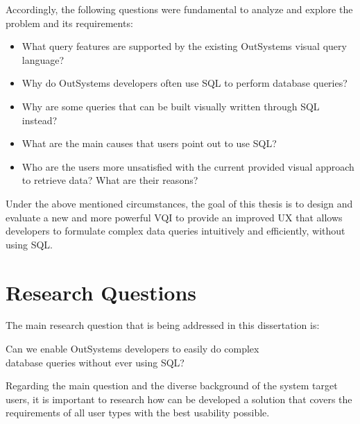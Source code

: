 Accordingly, the following questions were fundamental to analyze and explore the problem and its requirements: 

\begin{itemize}
  \item What query features are supported by the existing OutSystems visual query language?
  \item Why do OutSystems developers often use \gls{SQL} to perform database queries?
  \item Why are some queries that can be built visually written through \gls{SQL} instead?
  \item What are the main causes that users point out to use \gls{SQL}?
  \item Who are the users more unsatisfied with the current provided visual approach to retrieve data? What are their reasons?
\end{itemize}



Under the above mentioned circumstances, the goal of this thesis is to design and evaluate a new and more powerful \gls{VQI} to provide an improved \gls{UX} that allows developers to formulate complex data queries intuitively and efficiently, without using \gls{SQL}.

\section{Research Questions}
\label{sec:research_questions}
The main research question that is being addressed in this dissertation is: 

\begin{center}
  Can we enable OutSystems developers to easily do complex \\ database queries without ever using \gls{SQL}?
\end{center}

Regarding the main question and the diverse background of the system target users, it is important to research how can be developed a solution that covers the requirements of all user types with the best usability possible.

